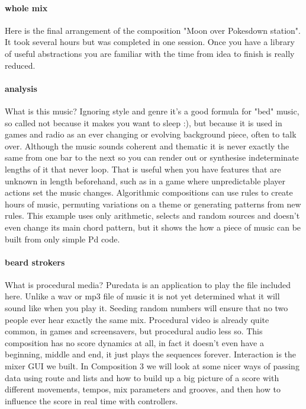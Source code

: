 \paragraph{whole mix}
Here is the final arrangement of the composition "Moon over Pokesdown
station". It took several hours but was completed in one session. Once you
have a library of useful abstractions you are familiar with the time
from idea to finish is really reduced.

\paragraph{analysis}
What is this music? Ignoring style and genre it's a good formula for "bed" music, so called not because
it makes you want to sleep :), but because it is used in games and radio
as an ever changing or evolving background piece, often to talk over. Although the
music sounds coherent and thematic it is never exactly the same from one bar to
the next so you can render out or synthesise indeterminate lengths of it
that never loop. That is useful when you have features that are unknown in length 
beforehand, such as in a game where unpredictable player actions set
the music changes. Algorithmic compositions can use rules to create
hours of music, permuting variations on a theme or generating 
patterns from new rules. This example uses only arithmetic, selects and
random sources and doesn't even change its main chord pattern, but it shows
the how a piece of music can be built from only simple Pd code.

\paragraph{beard strokers}
What is procedural media? Puredata
is an application to play the file included here. Unlike
a wav or mp3 file of music it is not yet determined what it will sound like when you
play it. Seeding random numbers will ensure that no two people ever hear
exactly the same mix. Procedural video is already quite common, in games
and screensavers, but procedural audio less so.  This composition has no
score dynamics at all, in fact it doesn't even have a beginning, middle and end,
it just plays the sequences forever. Interaction is the mixer GUI we built.
In Composition 3 we will look at some nicer ways of passing data using route and lists and how to build up a big picture
of a score with different movements, tempos, mix parameters and grooves, and then
how to influence the score in real time with controllers.